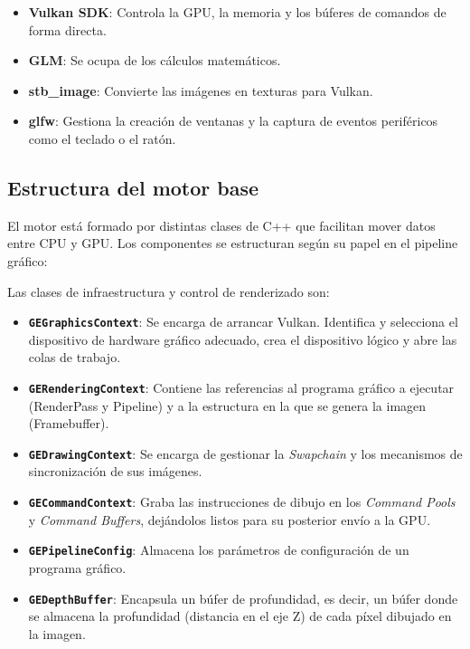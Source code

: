 \begin{itemize}
\item \textbf{Vulkan SDK}: Controla la GPU, la memoria y los búferes de comandos de forma directa.
\item \textbf{GLM}: Se ocupa de los cálculos matemáticos. 
\item \textbf{stb\_image}: Convierte las imágenes en texturas para Vulkan.
\item \textbf{glfw}: Gestiona la creación de ventanas y la captura de eventos periféricos como el teclado o el ratón.
\end{itemize}

\subsection{Estructura del motor base}

El motor está formado por distintas clases de C++ que facilitan mover datos entre CPU y GPU. 
Los componentes se estructuran según su papel en el pipeline gráfico:


\noindent Las clases de infraestructura y control de renderizado son:

\begin{itemize}
\item \textbf{\texttt{GEGraphicsContext}}: Se encarga de arrancar Vulkan. Identifica y selecciona el dispositivo de hardware gráfico adecuado, crea el dispositivo lógico y abre las colas de trabajo.
\item \textbf{\texttt{GERenderingContext}}: Contiene las referencias al programa gráfico a ejecutar (RenderPass y Pipeline) y a la estructura en la que se genera la imagen (Framebuffer).
\item \textbf{\texttt{GEDrawingContext}}: Se encarga de gestionar la \textit{Swapchain} y los mecanismos de sincronización de sus imágenes.                                        
\item \textbf{\texttt{GECommandContext}}: Graba las instrucciones de dibujo en los \textit{Command Pools} y \textit{Command Buffers}, dejándolos listos para su posterior envío a la GPU.
\item \textbf{\texttt{GEPipelineConfig}}: Almacena los parámetros de configuración de un programa gráfico.
\item \textbf{\texttt{GEDepthBuffer}}: Encapsula un búfer de profundidad, es decir, un búfer donde se almacena la profundidad (distancia en el eje Z) de cada píxel dibujado en la imagen.
\end{itemize}



